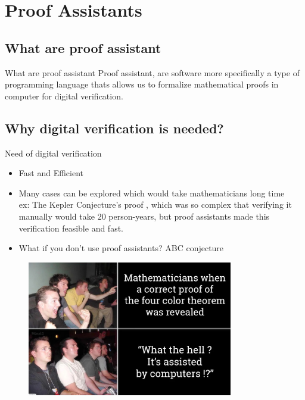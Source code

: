 \documentclass[aspectratio=169, 12pt]{beamer}
\begin{document}
\TitlePage        
\SectionPage    
\SubsectionPage    %
\ProgressBar       %
\PageNumbering     %


     

\section{Proof Assistants} 
\subsection*{What are proof assistant}
\begin{frame}{What are proof assistant}
    Proof assistant, are software more specifically a type of programming language thats allows us to 
    formalize mathematical proofs in computer for digital verification. 
\end{frame}
\subsection*{Why digital verification is needed?}
\begin{frame}{Need of digital verification}
    \begin{itemize}
        \item Fast and Efficient 
        \item Many cases can be explored which would take mathematicians  long time \\
           \indent  \footnotesize ex:   The Kepler Conjecture's proof , which was so complex that verifying it manually would take 20 person-years, but proof assistants made this verification feasible and fast. 
    
        \item What if you don't use proof assistants? ABC conjecture
    \end{itemize}

\end{frame}


\begin{frame}
    \begin{figure}[h]
  \centering
  \includegraphics[width=0.8\textwidth]{pa.jpeg}
\end{figure}
\end{frame}
\end{document}

